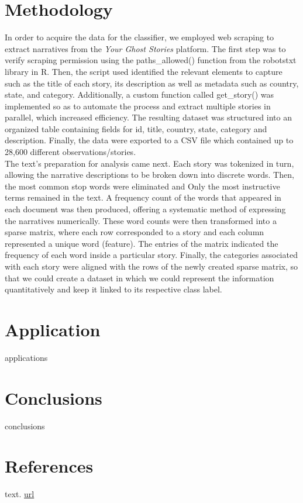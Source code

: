 \documentclass[twocolumn]{article}
\begin{document}
\section{Methodology}
In order to acquire the data for the classifier, we employed web scraping to extract narratives from the \textit{Your Ghost Stories} platform. The first step was to verify scraping permission using the paths\_allowed() function from the robotstxt library in R. Then, the script used identified the relevant elements to capture such as the title of each story, its description as well as metadata such as country, state, and category. Additionally, a custom function called get\_story() was implemented so as to automate the process and extract multiple stories in parallel, which increased efficiency. The resulting dataset was structured into an organized table containing fields for id, title, country, state, category and description. Finally, the data were exported to a CSV file which contained up to 28,600 different observations/stories. \\
The text's preparation for analysis came next. 
Each story was tokenized in turn, allowing the narrative descriptions to be broken down into discrete words. Then, the most common stop words were eliminated and Only the most instructive terms remained in the text. A frequency count of the words that appeared in each document was then produced, offering a systematic method of  expressing the narratives numerically. These word counts were then transformed into a sparse matrix, where each row corresponded to a story and each column represented a unique word (feature). The entries of the matrix indicated the frequency of each word inside a particular story. 
Finally, the categories associated with each story were aligned with the rows of the newly created sparse matrix, so that we could create a dataset in which we could represent the information quantitatively and keep it linked to its respective class label.


\section{Application}
applications

\section{Conclusions}
conclusions


\section{References}

\begin{thebibliography}{9}
\setlength{\itemsep}{0pt}
\setlength{\parskip}{0pt}


text. 
\url{url}

\vspace{0.3cm}


\end{thebibliography}
\end{document}
